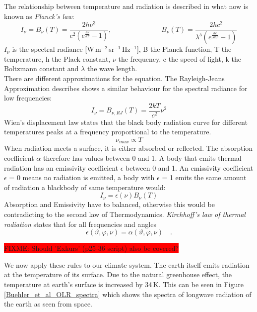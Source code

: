 The relationship between temperature and radiation is described in what now is known as \textit{Planck's law}:
\begin{equation}
I_{\nu} = B_{\nu}(T) = \frac{2h\nu^3}{c^2(e^{\frac{h\nu}{kT}}-1)}, 
               \hspace{3cm} B_{\nu}(T) = \frac{2hc^2}{\lambda^5(e^{\frac{hc}{\lambda kT}}-1)}
\end{equation}
$I_\nu$ is the spectral radiance [W\,m$^{-2}$\,sr$^{-1}$\,Hz$^{-1}$], B the Planck function, T the temperature, h the  Plack constant, $\nu$ the frequency, c the speed of light, k the Boltzmann constant and $\lambda$ the wave length.\\
There are different approximations for the equation. The Rayleigh-Jeans Approximation describes shows a similar behaviour for the spectral radiance for low frequencies:
\begin{equation}
I_{\nu} = B_{\nu, RJ}(T) = \frac{2kT}{c^2}\nu^2
\end{equation}
Wien's displacement law states that the black body radiation curve for different temperatures peaks at a frequency proportional to the temperature.
\begin{equation}
\nu_{max} \propto T
\end{equation}
When radiation meets a surface, it is either absorbed or reflected. The absorption coefficient $\alpha$ therefore has values between 0 and 1. A body that emits thermal radiation has an emissivity coefficient $\epsilon$ between 0 and 1. An emissivity coefficient $\epsilon$ = 0 means no radiation is emitted, a body with $\epsilon$ = 1 emits the same amount of radiation a blackbody of same temperature would:
\begin{equation}
I_\nu = \epsilon(\nu)B_\nu(T)
\end{equation}
Absorption and Emissivity have to balanced, otherwise this would be contradicting to the second law of Thermodynamics. \textit{Kirchhoff's law of thermal radiation} states that for all frequencies and angles 
\begin{equation}
\epsilon(\vartheta,\varphi,\nu) = \alpha(\vartheta,\varphi,\nu) \quad .
\end{equation}

\colorbox{red}{FIXME: Should 'Exkurs' (p25-36 script) also be covered?} \vspace{1cm}

We now apply these rules to our climate system. The earth itself emits radiation at the temperature of its surface. Due to the natural greenhouse effect, the temperature at earth's surface is increased by 34\,K. This can be seen in Figure \ref{Buehler_et_al_OLR_spectra} which shows the spectra of longwave radiation of the earth as seen from space.

